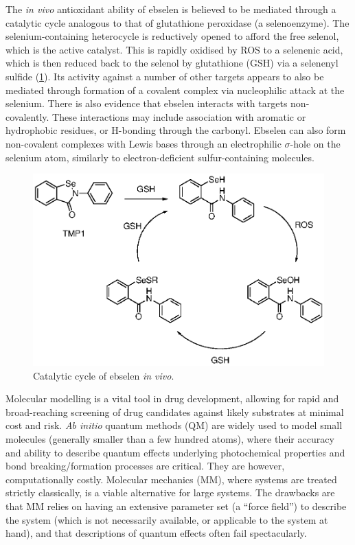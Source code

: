 \begin{refsection}
The \emph{in vivo} antioxidant ability of ebselen is believed to be mediated through a catalytic cycle analogous to that of glutathione peroxidase (a selenoenzyme).\autocite{Antony2011}
The selenium-containing heterocycle is reductively opened to afford the free selenol, which is the active catalyst.
This is rapidly oxidised by ROS to a selenenic acid, which is then reduced back to the selenol by glutathione (GSH) via a selenenyl sulfide (\cref{fig:catcycle}).
Its activity against a number of other targets appears to also be mediated through formation of a covalent complex via nucleophilic attack at the selenium.
There is also evidence that ebselen interacts with targets non-covalently.\autocite{Jin2020}
These interactions may include association with aromatic or hydrophobic residues, or H-bonding through the carbonyl.
Ebselen can also form non-covalent complexes with Lewis bases through an electrophilic $\sigma$-hole on the selenium atom, similarly to electron-deficient sulfur-containing molecules.\autocite{Thomas2015,Fellowes2019,Beno2015}

\begin{figure}
\centering
{}
\includegraphics[scale=0.74]{Figures/ebs-cat-cycle.eps}
\caption{Catalytic cycle of ebselen  \emph{in vivo}.}
\label{fig:catcycle}
\end{figure}

Molecular modelling is a vital tool in drug development, allowing for rapid and broad-reaching screening of drug candidates against likely substrates at minimal cost and risk.
\emph{Ab initio} quantum methods (QM) are widely used to model small molecules (generally smaller than a few hundred atoms), where their accuracy and ability to describe quantum effects underlying photochemical properties and bond breaking/formation processes are critical.
They are however, computationally costly.
Molecular mechanics (MM), where systems are treated strictly classically, is a viable alternative for large systems.
The drawbacks are that MM relies on having an extensive parameter set (a ``force field'') to describe the system (which is not necessarily available, or applicable to the system at hand), and that descriptions of quantum effects often fail spectacularly.


\end{refsection}
